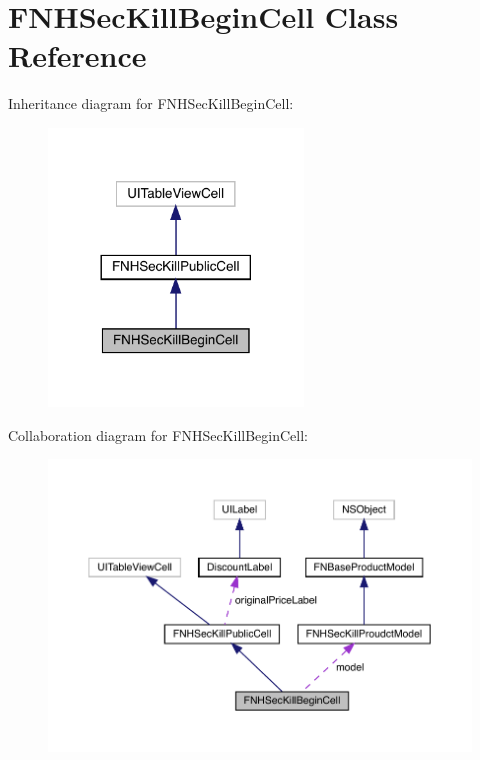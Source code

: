 \hypertarget{interface_f_n_h_sec_kill_begin_cell}{}\section{F\+N\+H\+Sec\+Kill\+Begin\+Cell Class Reference}
\label{interface_f_n_h_sec_kill_begin_cell}


Inheritance diagram for F\+N\+H\+Sec\+Kill\+Begin\+Cell\+:\nopagebreak
\begin{figure}[H]
\begin{center}
\leavevmode
\includegraphics[width=192pt]{interface_f_n_h_sec_kill_begin_cell__inherit__graph}
\end{center}
\end{figure}


Collaboration diagram for F\+N\+H\+Sec\+Kill\+Begin\+Cell\+:\nopagebreak
\begin{figure}[H]
\begin{center}
\leavevmode
\includegraphics[width=350pt]{interface_f_n_h_sec_kill_begin_cell__coll__graph}
\end{center}
\end{figure}
